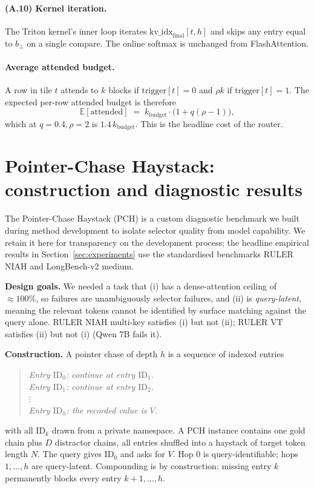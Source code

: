 \documentclass[11pt]{article}
\theoremstyle{remark}
\newcommand{\kbudget}{k_{\text{budget}}}
\begin{document}
\paragraph{(A.10) Kernel iteration.} The Triton kernel's inner loop iterates $\text{kv\_idx}_{\text{final}}[t,h]$ and skips any entry equal to $b_\bot$ on a single compare. The online softmax is unchanged from FlashAttention.

\paragraph{Average attended budget.} A row in tile $t$ attends to $k$ blocks if $\text{trigger}[t]=0$ and $\rho k$ if $\text{trigger}[t]=1$. The expected per-row attended budget is therefore
\begin{equation}
\mathbb{E}[\text{attended}] \;=\; \kbudget \cdot \bigl(1 + q(\rho - 1)\bigr),
\end{equation}
which at $q=0.4, \rho=2$ is $1.4\,\kbudget$. This is the headline cost of the router.

\section{Pointer-Chase Haystack: construction and diagnostic results}\label{app:pch}

The Pointer-Chase Haystack (PCH) is a custom diagnostic benchmark we built during method development to isolate selector quality from model capability. We retain it here for transparency on the development process; the headline empirical results in Section~\ref{sec:experiments} use the standardised benchmarks RULER NIAH and LongBench-v2 medium.

\textbf{Design goals.} We needed a task that (i) has a dense-attention ceiling of $\approx 100\%$, so failures are unambiguously selector failures, and (ii) is \emph{query-latent}, meaning the relevant tokens cannot be identified by surface matching against the query alone. RULER NIAH multi-key satisfies (i) but not (ii); RULER VT satisfies (ii) but not (i) (Qwen 7B fails it).

\textbf{Construction.} A pointer chase of depth $h$ is a sequence of indexed entries
\begin{quote}\itshape\small
Entry $\text{ID}_0$: continue at entry $\text{ID}_1$. \\
Entry $\text{ID}_1$: continue at entry $\text{ID}_2$. \\
$\vdots$ \\
Entry $\text{ID}_h$: the recorded value is $V$.
\end{quote}
with all $\text{ID}_k$ drawn from a private namespace. A PCH instance contains one gold chain plus $D$ distractor chains, all entries shuffled into a haystack of target token length $N$. The query gives $\text{ID}_0$ and asks for $V$. Hop $0$ is query-identifiable; hops $1,\dots,h$ are query-latent. Compounding is by construction: missing entry $k$ permanently blocks every entry $k{+}1, \dots, h$.
\end{document}
